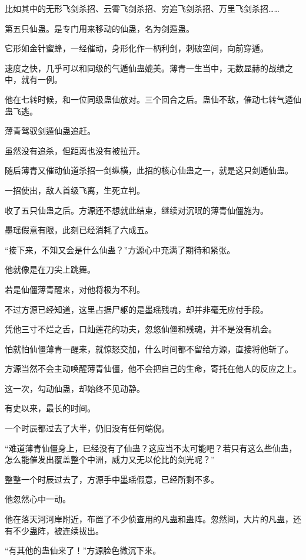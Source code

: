 \begin{this_body}
比如其中的无形飞剑杀招、云霄飞剑杀招、穷追飞剑杀招、万里飞剑杀招……

第五只仙蛊。是专门用来移动的仙蛊，名为剑遁蛊。

它形如金针蜜蜂，一经催动，身形化作一柄利剑，刺破空间，向前穿遁。

速度之快，几乎可以和同级的气遁仙蛊媲美。薄青一生当中，无数显赫的战绩之中，就有一例。

他在七转时候，和一位同级蛊仙放对。三个回合之后。蛊仙不敌，催动七转气遁仙蛊飞逃。

薄青驾驭剑遁仙蛊追赶。

虽然没有追杀，但距离也没有被拉开。

随后薄青又催动仙道杀招一剑纵横，此招的核心仙蛊之一，就是这只剑遁仙蛊。

一招使出，敌人首级飞离，生死立判。

收了五只仙蛊之后。方源还不想就此结束，继续对沉眠的薄青仙僵施为。

墨瑶假意有限，此刻已经消耗了六成五。

“接下来，不知又会是什么仙蛊？”方源心中充满了期待和紧张。

他就像是在刀尖上跳舞。

若是仙僵薄青醒来，对他将极为不利。

不过方源已经知道，这里占据尸躯的是墨瑶残魂，却并非毫无应付手段。

凭他三寸不烂之舌，口灿莲花的功夫，忽悠仙僵和残魂，并不是没有机会。

怕就怕仙僵薄青一醒来，就惊怒交加，什么时间都不留给方源，直接将他斩了。

方源当然不会主动唤醒薄青仙僵，他不会把自己的生命，寄托在他人的反应之上。

这一次，勾动仙蛊，却始终不见动静。

有史以来，最长的时间。

一个时辰都过去了大半，仍旧没有任何端倪。

“难道薄青仙僵身上，已经没有了仙蛊？这应当不太可能吧？若只有这么些仙蛊，怎么能催发出覆盖整个中洲，威力又无以伦比的剑光呢？”

整整一个时辰过去了，方源手中墨瑶假意，已经所剩不多。

他忽然心中一动。

他在落天河河岸附近，布置了不少侦查用的凡蛊和蛊阵。忽然间，大片的凡蛊，还有不少蛊阵，被连续拔出。

“有其他的蛊仙来了！”方源脸色微沉下来。


\end{this_body}
